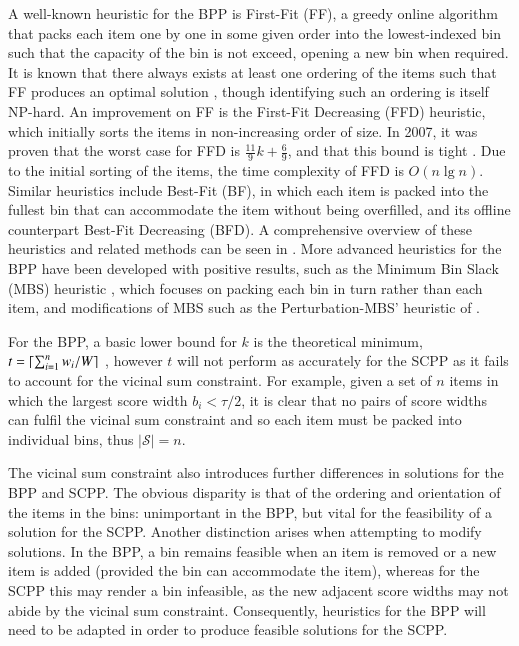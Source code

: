 \documentclass[authoryear]{elsarticle}
\begin{document}
A well-known heuristic for the BPP is First-Fit (FF), a greedy online algorithm that packs each item one by one in some given order into the lowest-indexed bin such that the capacity of the bin is not exceed, opening a new bin when required. It is known that there always exists at least one ordering of the items such that FF produces an optimal solution \citep{lewis2009}, though identifying such an ordering is itself NP-hard. An improvement on FF is the First-Fit Decreasing (FFD) heuristic, which initially sorts the items in non-increasing order of size. In 2007, it was proven that the worst case for FFD is $\frac{11}{9}k + \frac{6}{9}$, and that this bound is tight \citep{dosa2007}. Due to the initial sorting of the items, the time complexity of FFD is $O(n \lg n)$. Similar heuristics include Best-Fit (BF), in which each item is packed into the fullest bin that can accommodate the item without being overfilled, and its offline counterpart Best-Fit Decreasing (BFD). A comprehensive overview of these heuristics and related methods can be seen in \citet{coffman1984}. More advanced heuristics for the BPP have been developed with positive results, such as the Minimum Bin Slack (MBS) heuristic \citep{gupta1999}, which focuses on packing each bin in turn rather than each item, and modifications of MBS such as the Perturbation-MBS' heuristic of \citet{fleszar2002}. 

For the BPP, a basic lower bound for $k$ is the theoretical minimum, $t = \lceil\sum_{i=1}^{n} w_i / W\rceil$ \citep{martello1990l}, however $t$ will not perform as accurately for the SCPP as it fails to account for the vicinal sum constraint. For example, given a set of $n$ items in which the largest score width $b_i < \tau / 2$, it is clear that no pairs of score widths can fulfil the vicinal sum constraint and so each item must be packed into individual bins, thus $|\mathcal{S}| = n$.

The vicinal sum constraint also introduces further differences in solutions for the BPP and SCPP. The obvious disparity is that of the ordering and orientation of the items in the bins: unimportant in the BPP, but vital for the feasibility of a solution for the SCPP. Another distinction arises when attempting to modify solutions. In the BPP, a bin remains feasible when an item is removed or a new item is added (provided the bin can accommodate the item), whereas for the SCPP this may render a bin infeasible, as the new adjacent score widths may not abide by the vicinal sum constraint. Consequently, heuristics for the BPP will need to be adapted in order to produce feasible solutions for the SCPP.
\end{document}
